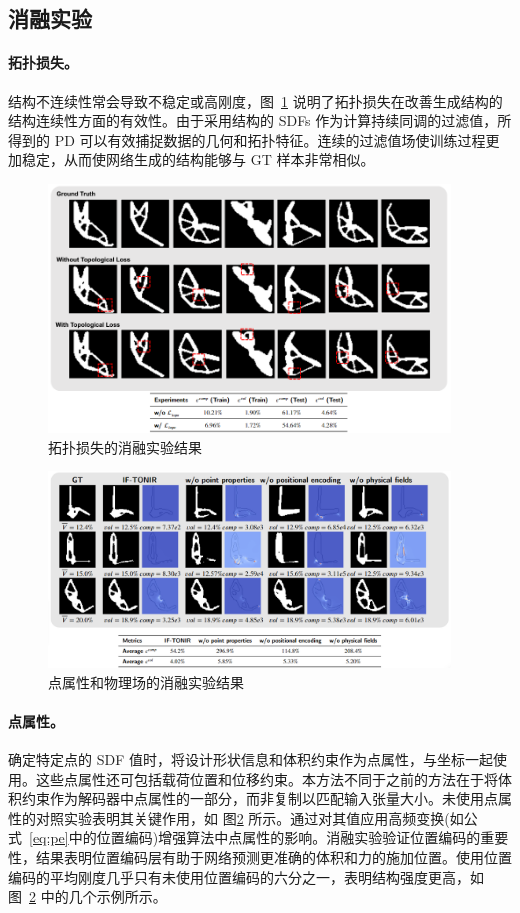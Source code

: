 \subsection{消融实验}
\paragraph{拓扑损失。}
结构不连续性常会导致不稳定或高刚度，图~\ref{fig:topo-comparison} 说明了拓扑损失在改善生成结构的结构连续性方面的有效性。由于采用结构的 SDFs 作为计算持续同调的过滤值，所得到的 PD 可以有效捕捉数据的几何和拓扑特征。连续的过滤值场使训练过程更加稳定，从而使网络生成的结构能够与 GT 样本非常相似。
\begin{figure}[htbp]
    \centering
    \includegraphics[width=0.95\textwidth]{./figures/TONIR/abla-topo.png}
    \caption{拓扑损失的消融实验结果}
    \label{fig:topo-comparison}
\end{figure}
\begin{figure}[htbp]
    \centering
    \includegraphics[width=0.95\textwidth]{./figures/TONIR/abla-pp.png}
    \caption{点属性和物理场的消融实验结果}
    \label{fig:ablation}
\end{figure}

\paragraph{点属性。}
确定特定点的 SDF 值时，将设计形状信息和体积约束作为点属性，与坐标一起使用。这些点属性还可包括载荷位置和位移约束。本方法不同于之前的方法在于将体积约束作为解码器中点属性的一部分，而非复制以匹配输入张量大小。未使用点属性的对照实验表明其关键作用，如 图\ref{fig:ablation} 所示。通过对其值应用高频变换(如公式~\eqref{eq:pe}中的位置编码)增强算法中点属性的影响。消融实验验证位置编码的重要性，结果表明位置编码层有助于网络预测更准确的体积和力的施加位置。使用位置编码的平均刚度几乎只有未使用位置编码的六分之一，表明结构强度更高，如 图~\ref{fig:ablation} 中的几个示例所示。

